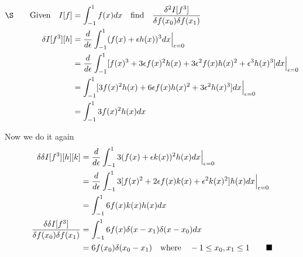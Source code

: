 \documentclass{memoir}
\begin{document}
\begin{align*}
    \qq*{\S}\qq{Given}I[f] & =\int_{-1}^{1} f(x)dx\qq{find}\frac{\delta^2 I[f^3]}{\delta f(x_0)\delta f(x_1)}                                                   \\
    \delta I[f^3][h]       & =\frac{d}{d\epsilon}\int_{-1}^{1} (f(x)+\epsilon h(x))^3 dx\Big\vert_{\epsilon=0}                                                  \\
                           & =\frac{d}{d\epsilon}\int_{-1}^{1} [f(x)^3+3\epsilon f(x)^2 h(x)+3\epsilon^2 f(x)h(x)^2+\epsilon^3 h(x)^3] dx\Big\vert_{\epsilon=0} \\
                           & =\int_{-1}^{1} [3f(x)^2 h(x)+6\epsilon f(x)h(x)^2+3\epsilon^2 h(x)^3] dx\Big\vert_{\epsilon=0}                                     \\
                           & =\int_{-1}^{1} 3f(x)^2 h(x) dx                                                                                                     \\
\end{align*}


Now we do it again
\begin{align*}
    \delta \delta I[f^3][h][k]                              & =\frac{d}{d\epsilon}\int_{-1}^{1} 3(f(x)+\epsilon k(x))^2 h(x) dx\Big\vert_{\epsilon=0}                        \\
                                                            & =\frac{d}{d\epsilon}\int_{-1}^{1} 3[f(x)^2+2\epsilon f(x)k(x)+\epsilon^2 k(x)^2] h(x) dx\Big\vert_{\epsilon=0} \\
                                                            & =\int_{-1}^{1} 6f(x)k(x)h(x) dx                                                                                \\
    \frac{\delta \delta I[f^3]}{\delta f(x_0)\delta f(x_1)} & =\int_{-1}^{1} 6f(x)\delta(x-x_1)\delta(x-x_0) dx                                                              \\
                                                            & =6f(x_0)\delta(x_0-x_1)\qq{where}  -1\leq x_0, x_1\leq 1 \qquad \blacksquare                                   \\
\end{align*}
\end{document}

